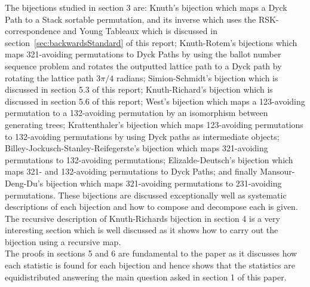 \documentclass[12pt]{article}
\begin{document}
The bijections studied in section 3 are: Knuth's bijection which maps a Dyck Path to a Stack sortable permutation, and its inverse which uses the RSK-correspondence and Young Tableaux which is discussed in section~\ref{sec:backwardsStandard} of this report; Knuth-Rotem's bijections which maps 321-avoiding permutations to Dyck Paths by using the ballot number sequence problem and rotates the outputted lattice path to a Dyck path by rotating the lattice path $3\pi/4$ radians; Simion-Schmidt's bijection which is discussed in section 5.3 of this report; Knuth-Richard's bijection which is discussed in section 5.6 of this report; West's bijection which maps a 123-avoiding permutation to a 132-avoiding permutation by an isomorphism between generating trees; Krattenthaler's bijection which maps 123-avoiding permutations to 132-avoiding permutations by using Dyck paths as intermediate objects; Billey-Jockusch-Stanley-Reifegerste's bijection which maps 321-avoiding permutations to 132-avoiding permutations; Elizalde-Deutsch's bijection which maps 321- and 132-avoiding permutations to Dyck Paths; and finally Mansour-Deng-Du's bijection which maps 321-avoiding permutations to 231-avoiding permutations. These bijections are discussed exceptionally well as systematic descriptions of each bijection and how to compose and decompose each is given.\\
The recursive description of Knuth-Richards bijection in section 4 is a very interesting section which is well discussed as it shows how to carry out the bijection using a recursive map.\\
The proofs in sections 5 and 6 are fundamental to the paper as it discusses how each statistic is found for each bijection and hence shows that the statistics are equidistributed answering the main question asked in section 1 of this paper.
\end{document}
